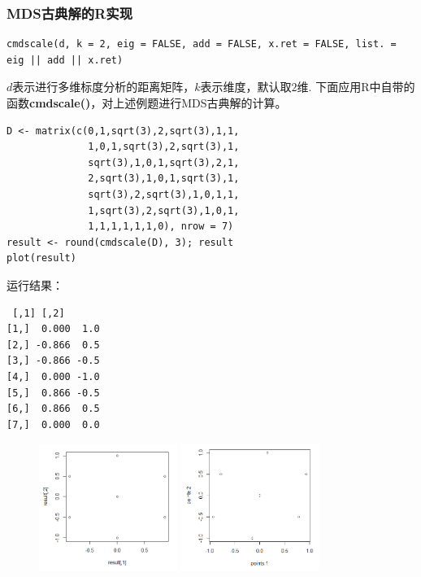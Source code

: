 \documentclass[UTF8, compress]{ctexbeamer}
\begin{document}
	
	\begin{frame}[fragile]
	\frametitle{{\sffamily MDS}{\heiti 古典解的}{\sffamily R}{\heiti 实现}}
		\pause
		
\begin{lstlisting}[style=A]
cmdscale(d, k = 2, eig = FALSE, add = FALSE, x.ret = FALSE, list. = eig || add || x.ret)
\end{lstlisting}

		\pause
		
		\vspace{.3cm}
		
		$d$表示进行多维标度分析的距离矩阵，$k$表示维度，默认取$2$维.
		\pause
		下面应用R中自带的函数\textbf{cmdscale()}，对上述例题进行MDS古典解的计算。
		
		\pause
		
\begin{lstlisting}[style=A]
D <- matrix(c(0,1,sqrt(3),2,sqrt(3),1,1,
              1,0,1,sqrt(3),2,sqrt(3),1,
              sqrt(3),1,0,1,sqrt(3),2,1,
              2,sqrt(3),1,0,1,sqrt(3),1,
              sqrt(3),2,sqrt(3),1,0,1,1,
              1,sqrt(3),2,sqrt(3),1,0,1,
              1,1,1,1,1,1,0), nrow = 7)
result <- round(cmdscale(D), 3); result
plot(result)
\end{lstlisting}

	\end{frame}



	\begin{frame}[fragile]

		运行结果：
		\pause
\begin{lstlisting}
 [,1] [,2]
[1,]  0.000  1.0
[2,] -0.866  0.5
[3,] -0.866 -0.5
[4,]  0.000 -1.0
[5,]  0.866 -0.5
[6,]  0.866  0.5
[7,]  0.000  0.0
\end{lstlisting}
		\pause
		\vspace{-.25cm}
		\begin{figure}[H]
			\centering
			\includegraphics[width=4.5cm]{figures/1}
			\qquad
			\includegraphics[width=4.5cm]{figures/2}
		\end{figure}
		
	\end{frame}
\end{document}
